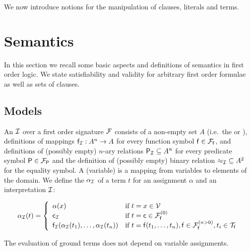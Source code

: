 We now introduce notions for the manipulation
of clauses, literals and terms.









\section{Semantics}\label{sec:semantics}

In this section we recall some basic aspects and definitions of semantics in first order logic.
We state satisfiability and validity 
for arbitrary first order formulae as well as sets of clauses.

\subsection{Models}

\begin{definition}\label{def:interpretation}
	An  \( \mcI \)
	over a first order signature \( \mcF \) consists of a
	non-empty set \( A \)
	(i.e.\ the  or ),
%
	definitions of mappings
	\( \mf_\mcI: A^n\rightarrow A \)
	for every function symbol \( \mf\in\mcFf \),
	and definitions of (possibly empty) \(n\)-ary relations
	 \( {\mP_\mcI}\subseteq A^n \) for every predicate symbol \( \mP\in\mcFP \)
	 and the definition of (possibly empty) binary relation \( {\mEQ_\mcI}\subseteq A^2 \) for the equality symbol.
%
	 A (variable)  is a mapping from variables to elements of the domain.
%
	 We define the  \( \alpha_\mcI \) of a term \( t \)
	 for an assignment \( \alpha \) and an interpretation \( \mcI \):

	 \begin{gather*}
	 \MDEFINE{\alpha_\mcI(t)
	 }{ll}{
	 	\alpha(x)
	 	&\text{if }t=x\in\mcV \\
	 	\mc_\mcI
	 	&\text{if }t=\mc\in\mcFfn[0]
	 	\\
	 	\mf_\mcI (\alpha_\mcI(t_1),\ldots,\alpha_\mcI(t_n))
	 	&\text{if }t=\mf(t_1,\ldots,t_n), \mf\in\mcFfn[n>0], t_i\in\mcTf
 }
	 \end{gather*}

\end{definition}
\begin{remark}
	The evaluation of ground terms does not depend on variable assignments.
\end{remark}

